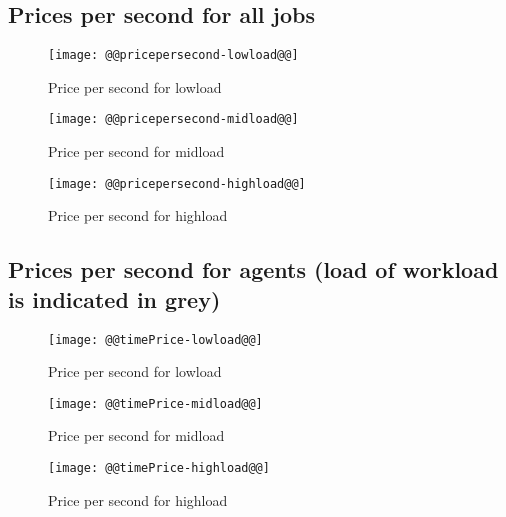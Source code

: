 \documentclass[11pt]{article}
\begin{document}
\newpage
\subsection{Prices per second for all jobs}
\begin{figure}[htbp]
  \begin{center}
    \texttt{[image: @@pricepersecond-lowload@@]}
    \caption{Price per second for lowload}
    \label{fig:pricepersecond-lowload}
  \end{center}
\end{figure}
\begin{figure}[htbp]
  \begin{center}
    \texttt{[image: @@pricepersecond-midload@@]}
    \caption{Price per second for midload}
    \label{fig:pricepersecond-midload}
  \end{center}
\end{figure}
\begin{figure}[htbp]
  \begin{center}
    \texttt{[image: @@pricepersecond-highload@@]}
    \caption{Price per second for highload}
    \label{fig:pricepersecond-highload}
  \end{center}
\end{figure}

\newpage
\subsection{Prices per second for agents (load of workload is indicated in grey)}
\begin{figure}[htbp]
  \begin{center}
    \texttt{[image: @@timePrice-lowload@@]}
    \caption{Price per second for lowload}
    \label{fig:timepricepersecond-lowload}
  \end{center}
\end{figure}
\begin{figure}[htbp]
  \begin{center}
    \texttt{[image: @@timePrice-midload@@]}
    \caption{Price per second for midload}
    \label{fig:timepricepersecond-midload}
  \end{center}
\end{figure}
\begin{figure}[htbp]
  \begin{center}
    \texttt{[image: @@timePrice-highload@@]}
    \caption{Price per second for highload}
    \label{fig:timepricepersecond-highload}
  \end{center}
\end{figure}
\end{document}

